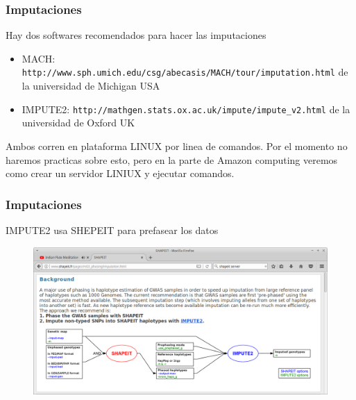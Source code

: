 \documentclass{beamer}\usepackage[]{graphicx}\usepackage[]{color}
\begin{document}
\begin{frame}[fragile]
\frametitle{Imputaciones}

Hay dos softwares recomendados para hacer las imputaciones

\begin{itemize}
\item MACH: {\scriptsize {\tt http://www.sph.umich.edu/csg/abecasis/MACH/tour/imputation.html}}
de la universidad de Michigan USA
\item IMPUTE2: {\tt http://mathgen.stats.ox.ac.uk/impute/impute\_v2.html}
de la universidad de Oxford UK
\end{itemize}

Ambos corren en plataforma LINUX por linea de comandos. Por el momento no haremos practicas sobre esto, pero en la parte de Amazon computing veremos como crear un servidor LINIUX y ejecutar comandos. 

\end{frame}


\begin{frame}[fragile]
\frametitle{Imputaciones}
IMPUTE2 usa SHEPEIT para prefasear los datos

\begin{figure}[htbp]
\begin{center}
\includegraphics[width=.5\linewidth]{impute.png}
\end{center}
\end{figure}

\end{frame}
\end{document}
